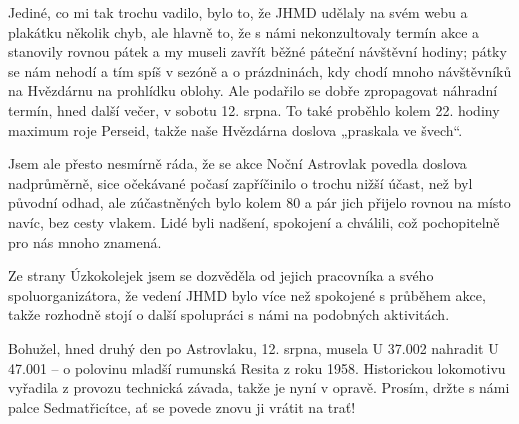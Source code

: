 \documentclass[10pt,a5paper,twoside]{book}
\begin{document}
Jediné, co mi tak trochu vadilo, bylo to, že JHMD udělaly na svém webu a plakátku několik chyb, ale hlavně to, že s námi nekonzultovaly termín akce a stanovily rovnou pátek a my museli zavřít běžné páteční návštěvní hodiny; pátky se nám nehodí a tím spíš v sezóně a o prázdninách, kdy chodí mnoho návštěvníků na Hvězdárnu na prohlídku oblohy. Ale podařilo se dobře zpropagovat náhradní termín, hned další večer, v sobotu 12. srpna. To také proběhlo kolem 22. hodiny maximum roje Perseid, takže naše Hvězdárna doslova „praskala ve švech“.


Jsem ale přesto nesmírně ráda, že se akce Noční Astrovlak povedla doslova nadprůměrně, sice očekávané počasí zapříčinilo o trochu nižší účast, než byl původní odhad, ale zúčastněných bylo kolem 80 a pár jich přijelo rovnou na místo navíc, bez cesty vlakem. Lidé byli nadšení, spokojení a chválili, což pochopitelně pro nás mnoho znamená.


Ze strany Úzkokolejek jsem se dozvěděla od jejich pracovníka a svého spoluorganizátora, že vedení JHMD bylo více než spokojené s průběhem akce, takže rozhodně stojí o další spolupráci s námi na podobných aktivitách.


Bohužel, hned druhý den po Astrovlaku, 12. srpna, musela U 37.002 nahradit U 47.001 – o polovinu mladší rumunská Resita z roku 1958. Historickou lokomotivu vyřadila z provozu technická závada, takže je nyní v opravě. Prosím, držte s námi palce Sedmatřicítce, ať se povede znovu ji vrátit na trať!
\end{document}

